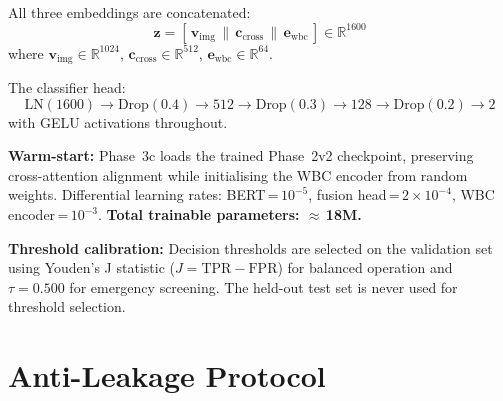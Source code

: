 \documentclass[conference]{IEEEtran}
\begin{document}
All three embeddings are concatenated:
\begin{equation}
  \mathbf{z} = [\,\mathbf{v}_{\text{img}} \,\|\, \mathbf{c}_{\text{cross}} \,\|\, \mathbf{e}_{\text{wbc}}\,] \in \mathbb{R}^{1600}
  \label{eq:concat}
\end{equation}
where $\mathbf{v}_{\text{img}} \in \mathbb{R}^{1024}$, $\mathbf{c}_{\text{cross}} \in \mathbb{R}^{512}$, $\mathbf{e}_{\text{wbc}} \in \mathbb{R}^{64}$.

The classifier head:
\begin{equation}
  \text{LN}(1600) \to \text{Drop}(0.4) \to 512 \to \text{Drop}(0.3) \to 128 \to \text{Drop}(0.2) \to 2
  \label{eq:head}
\end{equation}
with GELU activations throughout.

\textbf{Warm-start:} Phase~3c loads the trained Phase~2v2 checkpoint, preserving cross-attention alignment while initialising the WBC encoder from random weights. Differential learning rates: BERT\,=\,$10^{-5}$, fusion head\,=\,$2\!\times\!10^{-4}$, WBC encoder\,=\,$10^{-3}$. \textbf{Total trainable parameters: $\approx$\,18M.}

\textbf{Threshold calibration:} Decision thresholds are selected on the validation set using Youden's J statistic ($J = \text{TPR} - \text{FPR}$) for balanced operation and $\tau\!=\!0.500$ for emergency screening. The held-out test set is never used for threshold selection.

\section{\textcolor{aideep}{Anti-Leakage Protocol}}
\label{sec:antileak}
\end{document}
